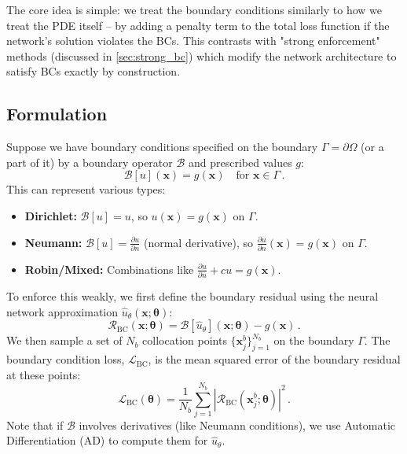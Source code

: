The core idea is simple: we treat the boundary conditions similarly to how we treat the PDE itself – by adding a penalty term to the total loss function if the network's solution violates the BCs. This contrasts with "strong enforcement" methods (discussed in \cref{sec:strong_bc}) which modify the network architecture to satisfy BCs exactly by construction.

\subsection{Formulation}

Suppose we have boundary conditions specified on the boundary $\Gamma = \partial\Omega$ (or a part of it) by a boundary operator $\mathcal{B}$ and prescribed values $g$:
%
\begin{equation*}
\mathcal{B}[u](\mathbf{x}) = g(\mathbf{x}) \quad \text{for } \mathbf{x} \in \Gamma\,.
\end{equation*}
%
This can represent various types:
\begin{itemize}
    \item \textbf{Dirichlet:} $\mathcal{B}[u] = u$, so $u(\mathbf{x}) = g(\mathbf{x})$ on $\Gamma$.
    \item \textbf{Neumann:} $\mathcal{B}[u] = \frac{\partial u}{\partial n}$ (normal derivative), so $\frac{\partial u}{\partial n}(\mathbf{x}) = g(\mathbf{x})$ on $\Gamma$.
    \item \textbf{Robin/Mixed:} Combinations like $\frac{\partial u}{\partial n} + c u = g(\mathbf{x})$.
\end{itemize}

To enforce this weakly, we first define the boundary residual using the neural network approximation $\hat{u}_\theta(\mathbf{x}; \boldsymbol{\theta})$:
%
\begin{equation*}
\mathcal{R}_{\text{BC}}(\mathbf{x}; \boldsymbol{\theta}) = \mathcal{B}[\hat{u}_\theta](\mathbf{x}; \boldsymbol{\theta}) - g(\mathbf{x})\,.
\end{equation*}
%
We then sample a set of $N_b$ collocation points $\{\mathbf{x}_j^b\}_{j=1}^{N_b}$ on the boundary $\Gamma$. The boundary condition loss, $\mathcal{L}_{\text{BC}}$, is the mean squared error of the boundary residual at these points:
%
\begin{equation}
\mathcal{L}_{\text{BC}}(\boldsymbol{\theta}) = \frac{1}{N_{b}} \sum_{j=1}^{N_{b}} \left| \mathcal{R}_{\text{BC}}(\mathbf{x}_j^b; \boldsymbol{\theta}) \right|^2\,.
\label{eq:bc_loss_weak}
\end{equation}
%
Note that if $\mathcal{B}$ involves derivatives (like Neumann conditions), we use Automatic Differentiation (AD) to compute them for $\hat{u}_\theta$.

